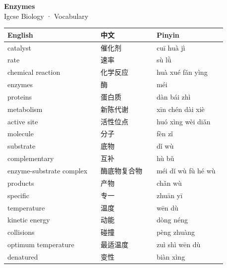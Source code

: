 \documentclass[11pt]{article}
\begin{document}
\begin{center}
  {\LARGE\bfseries Enzymes}\\[0.35em]
  {\large Igcse Biology · Vocabulary}
\end{center}
\vspace{0.6em}

\begin{longtable}{@{}p{0.40\linewidth}p{0.24\linewidth}p{0.30\linewidth}@{}}
\toprule
\textbf{English} & \textbf{中文} & \textbf{Pinyin} \\
\midrule
\endhead
\bottomrule
\endlastfoot
catalyst & 催化剂 & cuī huà jì \\
rate & 速率 & sù lǜ \\
chemical reaction & 化学反应 & huà xué fǎn yìng \\
enzymes & 酶 & méi \\
proteins & 蛋白质 & dàn bái zhì \\
metabolism & 新陈代谢 & xīn chén dài xiè \\
active site & 活性位点 & huó xìng wèi diǎn \\
molecule & 分子 & fèn zǐ \\
substrate & 底物 & dǐ wù \\
complementary & 互补 & hù bǔ \\
enzyme-substrate complex & 酶底物复合物 & méi dǐ wù fù hé wù \\
products & 产物 & chǎn wù \\
specific & 专一 & zhuān yī \\
temperature & 温度 & wēn dù \\
kinetic energy & 动能 & dòng néng \\
collisions & 碰撞 & pèng zhuàng \\
optimum temperature & 最适温度 & zuì shì wēn dù \\
denatured & 变性 & biàn xìng \\
\end{longtable}
\end{document}
